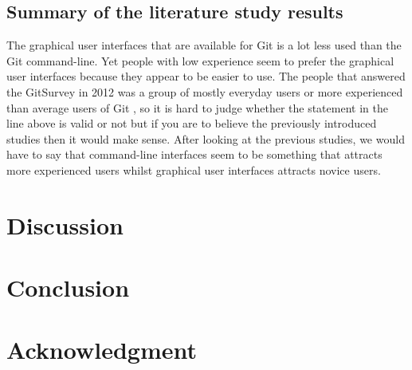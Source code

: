 \documentclass[12pt,a4paper,article,compsoc]{IEEEtran}
\begin{document}
			\subsection{Summary of the literature study results}
			The graphical user interfaces that are available for Git is a lot less used than the Git command-line. Yet people with low experience seem to prefer the graphical user interfaces because they appear to be easier to use. The people that answered the GitSurvey in 2012 was a group of mostly everyday users or more experienced than average users of Git \cite{GitUserSurvey}, so it is hard to judge whether the statement in the line above is valid or not but if you are to believe the previously introduced studies then it would make sense. After looking at the previous studies, we would have to say that command-line interfaces seem to be something that attracts more experienced users whilst graphical user interfaces attracts novice users.
		
		\section{Discussion}
		
		\section{Conclusion}
			
		
		\section*{Acknowledgment}
		
\end{document}
